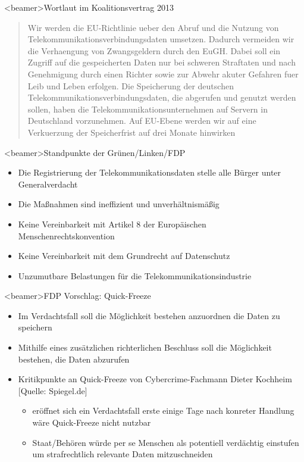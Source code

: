     \begin{frame}<beamer>{Wortlaut im Koalitionsvertrag 2013}
             \begin{quote}
Wir werden die EU-Richtlinie ueber den Abruf und die Nutzung von Telekommunikationsverbindungsdaten umsetzen. Dadurch vermeiden wir die Verhaengung von Zwangsgeldern durch den EuGH. Dabei soll ein Zugriff auf die gespeicherten Daten nur bei schweren Straftaten und nach Genehmigung durch einen Richter sowie zur Abwehr akuter Gefahren fuer Leib und Leben erfolgen. Die Speicherung der deutschen Telekommunikationsverbindungsdaten, die abgerufen und genutzt werden sollen, haben die Telekommunikationsunternehmen auf Servern in Deutschland vorzunehmen. Auf EU-Ebene werden wir auf eine Verkuerzung der Speicherfrist auf drei Monate hinwirken
\end{quote}
   \end{frame}
     
    \begin{frame}<beamer>{Standpunkte der Grünen/Linken/FDP}
       \begin{itemize}
        \item Die Registrierung der Telekommunikationsdaten stelle alle Bürger unter Generalverdacht
        \item Die Maßnahmen sind ineffizient und unverhältnismäßig
        \item Keine Vereinbarkeit mit Artikel 8 der Europäischen Menschenrechtskonvention
        \item Keine Vereinbarkeit mit dem Grundrecht auf Datenschutz
        \item Unzumutbare Belastungen für die Telekommunikationsindustrie
      \end{itemize}
    \end{frame}
        \begin{frame}<beamer>{FDP Vorschlag: Quick-Freeze}
       \begin{itemize}
        \item Im Verdachtsfall soll die Möglichkeit bestehen anzuordnen die Daten zu speichern
        \item Mithilfe eines zusätzlichen richterlichen Beschluss soll die Möglichkeit bestehen, die Daten abzurufen
        \item Kritikpunkte an Quick-Freeze von Cybercrime-Fachmann Dieter Kochheim [Quelle: Spiegel.de]
        \begin{itemize}
        \item eröffnet sich ein Verdachtsfall erste einige Tage nach konreter Handlung wäre Quick-Freeze nicht nutzbar 
        \item Staat/Behören würde per se Menschen als potentiell verdächtig einstufen um strafrechtlich relevante Daten mitzuschneiden 
        \end{itemize}
      \end{itemize}
    \end{frame}
